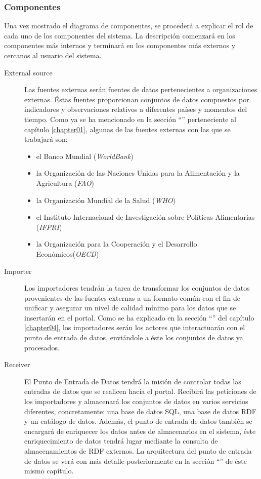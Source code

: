 \subsubsection{Componentes}
Una vez mostrado el diagrama de componentes, se procederá a explicar el rol de cada uno de los componentes del sistema.  La descripción comenzará en los componentes más internos y terminará en los componentes más externos y cercanos al usuario del sistema.
\begin{description}
	\item[External source]  Las fuentes externas  serán fuentes de datos pertenecientes a organizaciones externas.  Éstas fuentes proporcionan conjuntos de datos compuestos por indicadores y observaciones relativos a diferentes países y momentos del tiempo.  Como ya se ha mencionado en la sección ``'' perteneciente al capítulo \ref{chapter01}, algunas de las fuentes externas con las que se trabajará son:
	\begin{itemize}
		\item el Banco Mundial (\textit{WorldBank})
		\item la Organización de las Naciones Unidas para la Alimentación y la Agricultura (\textit{FAO})
		\item la Organización Mundial de la Salud (\textit{WHO})
		\item el Instituto Internacional de Investigación sobre Políticas Alimentarias (\textit{IFPRI})
		\item la Organización para la Cooperación y el Desarrollo Económicos(\textit{OECD})
	\end{itemize}
	\item[Importer]  Los importadores  tendrán la tarea de transformar los conjuntos de datos provenientes de las fuentes externas a un formato común con el fin de unificar y asegurar un nivel de calidad mínimo para los datos que se insertarán en el portal.  Como se ha explicado en la sección ``'' del capítulo \ref{chapter04}, los importadores serán los actores que interactuarán con el punto de entrada de datos, enviándole a éste los conjuntos de datos ya procesados.
	\item[Receiver]  El Punto de Entrada de Datos  tendrá la misión de controlar todas las entradas de datos que se realicen hacia el portal.  Recibirá las peticiones de los importadores y almacenará los conjuntos de datos en varios servicios diferentes, concretamente: una base de datos SQL, una base de datos RDF y un catálogo de datos.  Además, el punto de entrada de datos también se encargará de enriquecer los datos antes de almacenarlos en el sistema, éste enriquecimiento de datos tendrá lugar mediante la consulta de almacenamientos de RDF externos.  La arquitectura del punto de entrada de datos se verá con más detalle posteriormente en la sección ``'' de éste mismo capítulo.

\end{description}
